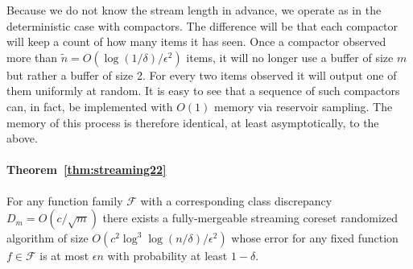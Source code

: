 \documentclass[12pt]{colt2019} %
\newcommand{\eps}{\epsilon}
\newcommand{\F}{\mathcal{F}}
\begin{document}
Because we do not know the stream length in advance, we operate as in the deterministic case with compactors. The difference will be that each compactor will keep a count of how many items it has seen. Once a compactor observed more than $\tilde{n} = O(\log(1/\delta)/\eps^2)$ items, it will no longer use a buffer of size $m$ but rather a buffer of size 2. For every two items observed it will output one of them uniformly at random. It is easy to see that a sequence of such compactors can, in fact, be implemented with $O(1)$ memory via reservoir sampling. 
The memory of this process is therefore identical, at least asymptotically, to the above.

\paragraph{Theorem~\ref{thm:streaming22}}
For any function family $\F$ with a corresponding class discrepancy $D_m = O(c/\sqrt{m})$ there exists a fully-mergeable streaming coreset randomized algorithm of size $O\left(c^2\log^3\log(n/\delta) /\eps^2\right)$ whose error for any fixed function $f \in \F$ is at most $\eps n$ with probability at least $1-\delta$. 
\end{document}
